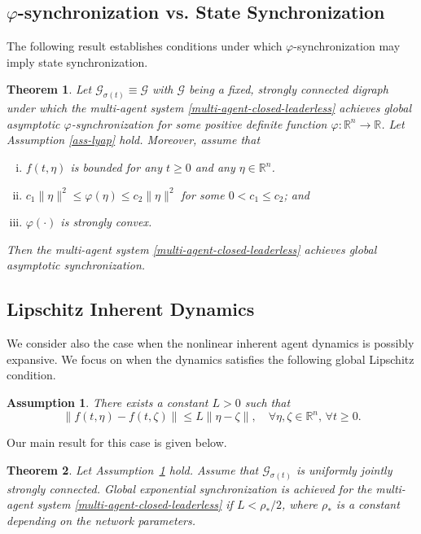 \documentclass[a4paper, 11pt]{article}
\newtheorem{theorem}{Theorem}
\newtheorem{assumption}{Assumption}
\def\R{\mathbb{R}}
\begin{document}
\subsection{$\varphi$-synchronization vs. State Synchronization}\label{discussion-phi-state}
The following result establishes conditions under which $\varphi$-synchronization may imply state synchronization.

\begin{theorem}\label{prop-guodong}
Let $\mathcal{G}_{\sigma(t)}\equiv \mathcal{G}$ with $\mathcal{G}$ being a fixed, strongly connected digraph under which the multi-agent system \eqref{multi-agent-closed-leaderless} achieves global asymptotic $\varphi$-synchronization
for some positive definite function $\varphi: {\R}^n \rightarrow \R$.
Let Assumption \ref{ass-lyap} hold.
Moreover, assume that
\begin{enumerate}[(i).]
\item $f(t,\eta)$ is bounded for any $t \geq 0$ and any $\eta \in {\R}^n$.
\item $c_1 \|\eta\|^2 \leq \varphi(\eta) \leq c_2 \|\eta\|^2$ for some $0<c_1\leq c_2$; and
\item $\varphi(\cdot)$ is strongly convex.
\end{enumerate}
Then the multi-agent system \eqref{multi-agent-closed-leaderless} achieves global asymptotic synchronization.
\end{theorem}

\subsection{Lipschitz Inherent Dynamics}\label{sec-unstable}
We consider also the case when the nonlinear inherent agent dynamics is possibly expansive.
We focus on when the dynamics satisfies
the following global Lipschitz condition.

\begin{assumption}\label{ass-phi-state-1}
There exists a constant $L>0$ such that
\begin{equation}\label{ass-unstable-nonlinear}
\|f(t,\eta)-f(t,\zeta)\| \leq L \|\eta-\zeta\|, \quad \forall \eta, \zeta \in {\R}^n, \, \forall t \geq 0.
\end{equation}
\end{assumption}

Our  main result for this case is given below.

\begin{theorem}\label{unstable-thm1}
Let Assumption~\ref{ass-phi-state-1} hold.
Assume that $\mathcal{G}_{\sigma(t)}$ is uniformly jointly strongly connected.
Global exponential synchronization is achieved for the
multi-agent system \eqref{multi-agent-closed-leaderless}
if $L< {\rho_*}/{2}$, where $\rho_*$ is a constant depending on the network parameters.
\end{theorem}
\end{document}
